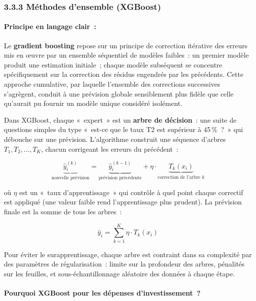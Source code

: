 \subsubsection*{3.3.3 \quad Méthodes d'ensemble (XGBoost)}

\paragraph{Principe en langage clair~:}

Le \textbf{gradient boosting} repose sur un principe de correction itérative des erreurs
mis en œuvre par un ensemble séquentiel de modèles faibles~: un premier modèle produit
une estimation initiale~; chaque modèle subséquent se concentre spécifiquement sur la
correction des résidus engendrés par les précédents. Cette approche cumulative, par laquelle
l'ensemble des corrections successives s'agrègent, conduit à une prévision globale
sensiblement plus fidèle que celle qu'aurait pu fournir un modèle unique considéré
isolément.

Dans XGBoost, chaque «~expert~» est un \textbf{arbre de décision}~: une suite de
questions simples du type «~est-ce que le taux T2 est supérieur à 45\,\%~?~» qui
débouche sur une prévision. L'algorithme construit une séquence d'arbres
$T_1, T_2, \ldots, T_K$, chacun corrigeant les erreurs du précédent~:

$$\underbrace{\hat{y}_i^{(k)}}_{\text{nouvelle pr\'evision}} = \underbrace{\hat{y}_i^{(k-1)}}_{\text{pr\'evision pr\'ec\'edente}} + \eta \cdot \underbrace{T_k(x_i)}_{\text{correction de l'arbre }k}$$

où $\eta$ est un «~taux d'apprentissage~» qui contrôle à quel point chaque correctif
est appliqué (une valeur faible rend l'apprentissage plus prudent). La prévision
finale est la somme de tous les arbres~:

$$\hat{y}_i = \sum_{k=1}^{K} \eta \cdot T_k(x_i)$$

Pour éviter le surapprentissage, chaque arbre est contraint dans sa complexité par
des paramètres de régularisation~: limite sur la profondeur des arbres, pénalités
sur les feuilles, et sous-échantillonnage aléatoire des données à chaque étape.

\paragraph{Pourquoi XGBoost pour les dépenses d'investissement~?}

